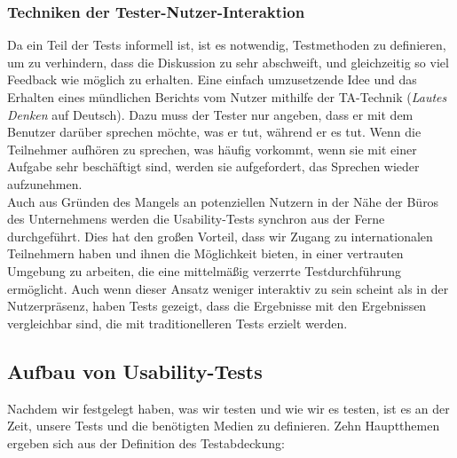 \subsubsection{Techniken der Tester-Nutzer-Interaktion}

Da ein Teil der Tests informell ist, ist es notwendig, Testmethoden zu definieren, um zu verhindern, dass die Diskussion zu sehr abschweift, und gleichzeitig so viel Feedback wie möglich zu erhalten.
Eine einfach umzusetzende Idee und das Erhalten eines mündlichen Berichts vom Nutzer mithilfe der \ac{TA}-Technik (\textit{Lautes Denken} auf Deutsch).
Dazu muss der Tester nur angeben, dass er mit dem Benutzer darüber sprechen möchte, was er tut, während er es tut.
Wenn die Teilnehmer aufhören zu sprechen, was häufig vorkommt, wenn sie mit einer Aufgabe sehr beschäftigt sind, werden sie aufgefordert, das Sprechen wieder aufzunehmen.\\

Auch aus Gründen des Mangels an potenziellen Nutzern in der Nähe der Büros des Unternehmens werden die Usability-Tests synchron aus der Ferne durchgeführt.
Dies hat den großen Vorteil, dass wir Zugang zu internationalen Teilnehmern haben und ihnen die Möglichkeit bieten, in einer vertrauten Umgebung zu arbeiten, die eine mittelmäßig verzerrte Testdurchführung ermöglicht.
Auch wenn dieser Ansatz weniger interaktiv zu sein scheint als in der Nutzerpräsenz, haben Tests gezeigt, dass die Ergebnisse mit den Ergebnissen vergleichbar sind, die mit traditionelleren Tests erzielt werden\cite{remoteUsabilityEvaluation}.

\subsection{Aufbau von Usability-Tests}

Nachdem wir festgelegt haben, was wir testen und wie wir es testen, ist es an der Zeit, unsere Tests und die benötigten Medien zu definieren.
Zehn Hauptthemen ergeben sich aus der Definition des Testabdeckung:

